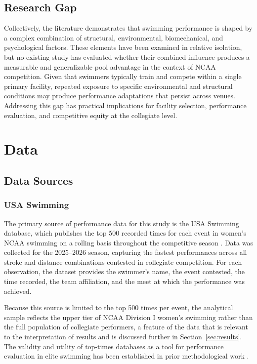 \documentclass[12pt]{article}
\begin{document}
\subsection{Research Gap}

Collectively, the literature demonstrates that swimming performance is shaped by
a complex combination of structural, environmental, biomechanical, and
psychological factors. These elements have been examined in relative isolation,
but no existing study has evaluated whether their combined influence produces a
measurable and generalizable pool advantage in the context of NCAA competition.
Given that swimmers typically train and compete within a single primary
facility, repeated exposure to specific environmental and structural conditions
may produce performance adaptations that persist across venues. Addressing this
gap has practical implications for facility selection, performance evaluation,
and competitive equity at the collegiate level.

\section{Data}
\label{sec:data}

\subsection{Data Sources}

\subsubsection{USA Swimming}

The primary source of performance data for this study is the USA Swimming
database, which publishes the top 500 recorded times for each event in women's
NCAA swimming on a rolling basis throughout the competitive season
\parencite{usaswimming2026}. Data was collected for the 2025--2026 season,
capturing the fastest performances across all stroke-and-distance combinations
contested in collegiate competition. For each observation, the dataset provides
the swimmer's name, the event contested, the time recorded, the team
affiliation, and the meet at which the performance was achieved.

Because this source is limited to the top 500 times per event, the analytical
sample reflects the upper tier of NCAA Division I women's swimming rather than
the full population of collegiate performers, a feature of the data that is
relevant to the interpretation of results and is discussed further in
Section~\ref{sec:results}. The validity and utility of top-times databases as
a tool for performance evaluation in elite swimming has been established in
prior methodological work \parencite{smith2002}.
\end{document}
